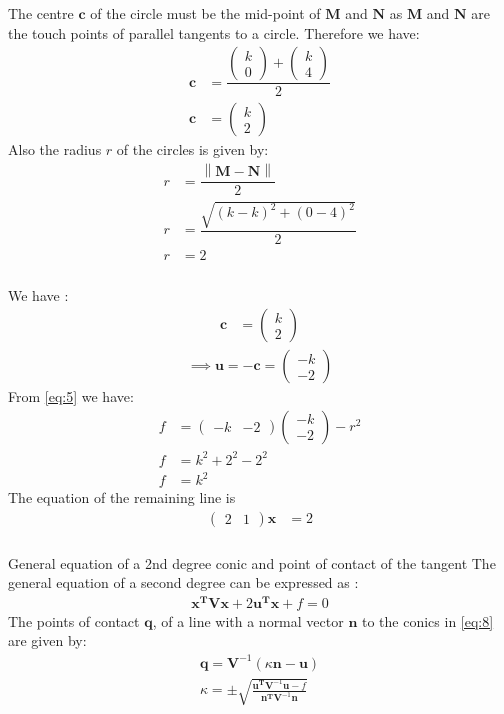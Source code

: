 \documentclass{beamer}
\providecommand{\brak}[1]{\ensuremath{\left(#1\right)}}
\newcommand{\myvec}[1]{\ensuremath{\begin{pmatrix}#1\end{pmatrix}}}
\newcommand\norm[1]{\left\lVert#1\right\rVert}
\renewcommand{\vec}[1]{\mathbf{#1}}
\begin{document}
\begin{frame}
\frametitle{}
The centre $\vec{c}$ of the circle must be the mid-point of $\vec{M}$ and $\vec{N}$ as $\vec{M}$ and $\vec{N}$ are the touch points of parallel tangents to a circle. Therefore we have:
\begin{align}
\vec{c} &= \dfrac{\myvec{k \\ 0} + \myvec{k \\ 4}}{2}\\
\vec{c} &= \myvec{k \\ 2}
\end{align}
Also the radius $r$ of the circles is given by:
\begin{align}
r &= \dfrac{\norm{\vec{M}-\vec{N}}}{2} \\
r &= \dfrac{\sqrt{(k-k)^{2}+(0-4)^{2}}}{2}\\
r &= 2
\end{align}
\end{frame}

\begin{frame}
\frametitle{}
We have :
\begin{align}
\vec{c} &= \myvec{k \\ 2}
\end{align}
\begin{align}
\implies \vec{u} = -\vec{c} = \myvec{-k \\ -2}
\end{align}
From \eqref{eq:5} we have:
\begin{align}
f &=\myvec{-k&-2}\myvec{-k\\-2}-r^2\\
f &= k^2 + 2^2 -2^2\\
f &= k^2\label{eq:6}
\end{align}
The equation of the remaining line is
\begin{align}
\myvec{2 & 1}\vec{x}& = 2 \label{eq:7}
\end{align}
\end{frame}

\begin{frame}
\frametitle{}
\begin{block}{General equation of a 2nd degree conic and point of contact of the tangent}
The general equation of a second degree can be expressed as :
\begin{align}
\vec{x^T}\vec{V}\vec{x}+2\vec{u^T}\vec{x}+f=0\label{eq:8}
\end{align}
The points of contact $\vec{q}$, of a line with a normal vector $\vec{n}$ to the conics in \eqref{eq:8} are given by:
\begin{align}
\vec{q} = \vec{V}^{-1}\brak{\kappa \vec{n}-\vec{u}} \label{eq:9} \\
\kappa = \pm \sqrt{\frac{\vec{u^T}\vec{V}^{-1}\vec{u}-f}{\vec{n^T}\vec{V}^{-1}\vec{n}}}\label{eq:10}
\end{align}
\end{block}
\end{frame}
\end{document}

